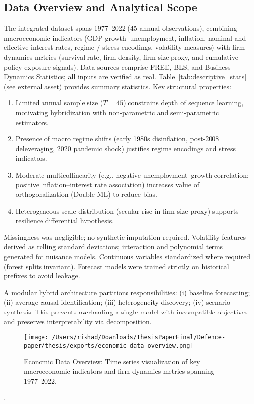 \subsection{Data Overview and Analytical Scope}
The integrated dataset spans 1977--2022 (45 annual observations), combining macroeconomic indicators (GDP growth, unemployment, inflation, nominal and effective interest rates, regime / stress encodings, volatility measures) with firm dynamics metrics (survival rate, firm density, firm size proxy, and cumulative policy exposure signals). Data sources comprise FRED, BLS, and Business Dynamics Statistics; all inputs are verified as real. Table~\ref{tab:descriptive_stats} (see external asset) provides summary statistics. Key structural properties:
\begin{enumerate}
  \item Limited annual sample size ($T=45$) constrains depth of sequence learning, motivating hybridization with non-parametric and semi-parametric estimators.
  \item Presence of macro regime shifts (early 1980s disinflation, post-2008 deleveraging, 2020 pandemic shock) justifies regime encodings and stress indicators.
  \item Moderate multicollinearity (e.g., negative unemployment--growth correlation; positive inflation--interest rate association) increases value of orthogonalization (Double ML) to reduce bias.
  \item Heterogeneous scale distribution (secular rise in firm size proxy) supports resilience differential hypothesis.
\end{enumerate}
Missingness was negligible; no synthetic imputation required. Volatility features derived as rolling standard deviations; interaction and polynomial terms generated for nuisance models. Continuous variables standardized where required (forest splits invariant). Forecast models were trained strictly on historical prefixes to avoid leakage.

A modular hybrid architecture partitions responsibilities: (i) baseline forecasting; (ii) average causal identification; (iii) heterogeneity discovery; (iv) scenario synthesis. This prevents overloading a single model with incompatible objectives and preserves interpretability via decomposition.
\begin{figure}[H]
\centering
\texttt{[image: /Users/rishad/Downloads/ThesisPaperFinal/Defence-paper/thesis/exports/economic\_data\_overview.png]}
\caption{Economic Data Overview: Time series visualization of key macroeconomic indicators and firm dynamics metrics spanning 1977--2022.}
\label{fig:economic_data_overview}
\end{figure}
.





